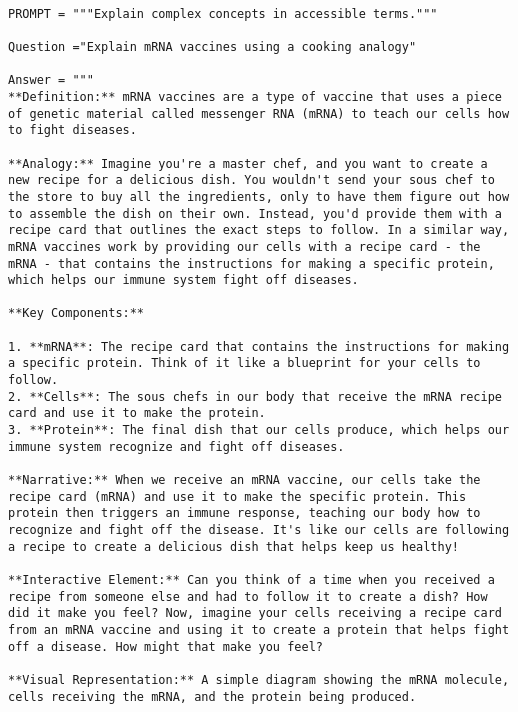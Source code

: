 \begin{tcolorbox}[title={\textbf{\small Performance After Optimization}}, boxrule=2pt, arc=0mm, breakable]
\begin{verbatim}

PROMPT = """Explain complex concepts in accessible terms."""

Question ="Explain mRNA vaccines using a cooking analogy"

Answer = """
**Definition:** mRNA vaccines are a type of vaccine that uses a piece of genetic material called messenger RNA (mRNA) to teach our cells how to fight diseases.

**Analogy:** Imagine you're a master chef, and you want to create a new recipe for a delicious dish. You wouldn't send your sous chef to the store to buy all the ingredients, only to have them figure out how to assemble the dish on their own. Instead, you'd provide them with a recipe card that outlines the exact steps to follow. In a similar way, mRNA vaccines work by providing our cells with a recipe card - the mRNA - that contains the instructions for making a specific protein, which helps our immune system fight off diseases.

**Key Components:**

1. **mRNA**: The recipe card that contains the instructions for making a specific protein. Think of it like a blueprint for your cells to follow.
2. **Cells**: The sous chefs in our body that receive the mRNA recipe card and use it to make the protein.
3. **Protein**: The final dish that our cells produce, which helps our immune system recognize and fight off diseases.

**Narrative:** When we receive an mRNA vaccine, our cells take the recipe card (mRNA) and use it to make the specific protein. This protein then triggers an immune response, teaching our body how to recognize and fight off the disease. It's like our cells are following a recipe to create a delicious dish that helps keep us healthy!

**Interactive Element:** Can you think of a time when you received a recipe from someone else and had to follow it to create a dish? How did it make you feel? Now, imagine your cells receiving a recipe card from an mRNA vaccine and using it to create a protein that helps fight off a disease. How might that make you feel?

**Visual Representation:** A simple diagram showing the mRNA molecule, cells receiving the mRNA, and the protein being produced.


\end{verbatim}
\end{tcolorbox}
